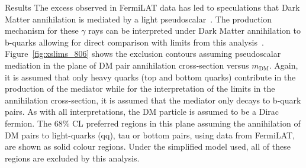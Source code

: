 \begin{section}{Results}
The excess observed in FermiLAT data has led to speculations that Dark Matter annihilation is mediated by a light pseudoscalar~\cite{Calore:2014nla}. 
The production mechanism for these $\gamma$ rays can be interpreted under Dark Matter annihilation to b-quarks allowing for direct 
comparison with limits from this analysis~\cite{Buchmueller:2015eea,Buckley:2014fba,Harris:2014hga}. Figure~\ref{fig:xslims_806} shows 
the exclusion contours assuming pseudoscalar mediation in the plane of DM pair annihilation cross-section versus $m_{\textrm{DM}}$. 
Again, it is assumed that only heavy quarks (top and bottom quarks) contribute in the production of the mediator while for  
the interpretation of the limits in the annihilation cross-section, it is assumed that the mediator only decays to b-quark pairs. 
As with all interpretations, the DM particle is assumed to be a Dirac fermion.
The 68\% CL preferred regions in this plane assuming the annihilation of DM pairs to light-quarks (qq), tau or bottom pairs, using data from FermiLAT, 
are shown as solid colour regions. Under the simplified model used, all of these regions are excluded by this analysis.



\end{section}
